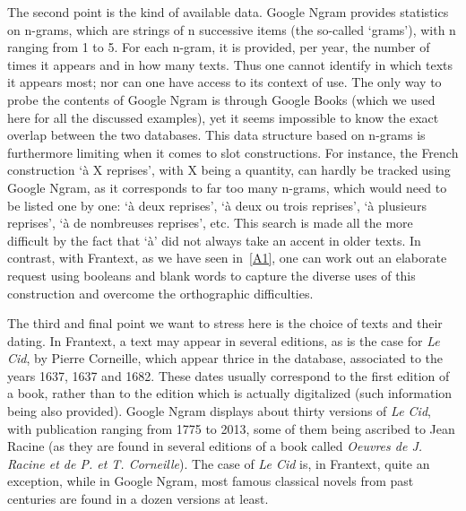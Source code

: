 \documentclass[12pt,twocolumn,amsmath,amssymb,aps,longbibliography]{revtex4-1}  %
\newcommand{\tit}{\textit}
\begin{document}
{{The second point is the kind of available data. Google Ngram provides statistics on n-grams, which are strings of n successive items (the so-called `grams'), with n ranging from 1 to 5. For each n-gram, it is provided, per year, the number of times it appears and in how many texts. Thus one cannot identify in which texts it appears most; nor can one have access to its context of use. The only way to probe the contents of Google Ngram is through Google Books (which we used here for all the discussed examples), yet it seems impossible to know the exact overlap between the two databases. This data structure based on n-grams is furthermore limiting when it comes to slot constructions. For instance, the French construction `\`a X reprises', with X being a quantity, can hardly be tracked using Google Ngram, as it corresponds to far too many n-grams, which would need to be listed one by one: `\`a deux reprises', `\`a deux ou trois reprises', `\`a plusieurs reprises', `\`a de nombreuses reprises', etc. This search is made all the more difficult by the fact that `\`a' did not always take an accent in older texts. In contrast, with Frantext, as we have seen in~\ref{A1}, one can work out an elaborate request using booleans and blank words to capture the diverse uses of this construction and overcome the orthographic difficulties. 

The third and final point we want to stress here is the choice of texts and their dating. In Frantext, a text may appear in several editions, as is the case for \textit{Le Cid}, by Pierre Corneille, which appear thrice in the database, associated to the years 1637, 1637 and 1682. These dates usually correspond to the first edition of a book, rather than to the edition which is actually digitalized (such information being also provided). Google Ngram displays about thirty versions of \textit{Le Cid}, with publication ranging from 1775 to 2013, some of them being ascribed to Jean Racine (as they are found in several editions of a book called \tit{Oeuvres de J. Racine et de P. et T. Corneille}). The case of \tit{Le Cid} is, in Frantext, quite an exception, while in Google Ngram, most famous classical novels from past centuries are found in a dozen versions at least. 

}}
\end{document}
